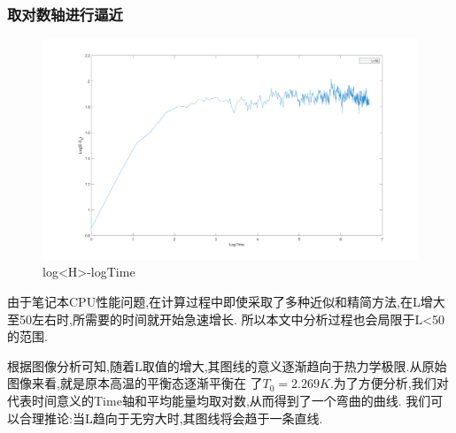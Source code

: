 \documentclass[UTF8,a4paper,10pt]{ctexart}
\begin{document}
\subsubsection{取对数轴进行逼近}
\begin{figure}[!htbp]
    \centering
    \includegraphics[width=1\textwidth,height=1\textwidth]{pictures/logL50.png}
    \caption{log<H>-logTime}
\end{figure}
由于笔记本CPU性能问题,在计算过程中即使采取了多种近似和精简方法,在L增大至50左右时,所需要的时间就开始急速增长.
所以本文中分析过程也会局限于L<50的范围.\newline

根据图像分析可知,随着L取值的增大,其图线的意义逐渐趋向于热力学极限.从原始图像来看,就是原本高温的平衡态逐渐平衡在
了$T_{0}=2.269K$.为了方便分析,我们对代表时间意义的Time轴和平均能量均取对数,从而得到了一个弯曲的曲线.
我们可以合理推论:当L趋向于无穷大时,其图线将会趋于一条直线.


\end{document}
